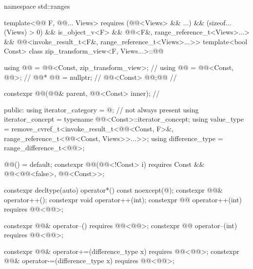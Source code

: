 %
\begin{codeblock}
namespace std::ranges {
  template<@@ F, @@... Views>
    requires (@@<Views> && ...) && (sizeof...(Views) > 0) && is_object_v<F> &&
              @@<F&, range_reference_t<Views>...> &&
              @@<invoke_result_t<F&, range_reference_t<Views>...>>
  template<bool Const>
  class zip_transform_view<F, Views...>::@@ {
    using @@ = @@<Const, zip_transform_view>;      // \expos
    using @@ = @@<Const, @@>;                 // \expos
    @@* @@ = nullptr;                                  // \expos
    @@<Const> @@;@\itcorr[-1]@                                    // \expos

    constexpr @@(@@& parent, @@<Const> inner);   // \expos

  public:
    using iterator_category = @\seebelownc@;                        // not always present
    using iterator_concept  = typename @@<Const>::iterator_concept;
    using value_type =
      remove_cvref_t<invoke_result_t<@@<Const, F>&,
                                     range_reference_t<@@<Const, Views>>...>>;
    using difference_type = range_difference_t<@@>;

    @@() = default;
    constexpr @@(@@<!Const> i)
      requires Const && @@<@@<false>, @@<Const>>;

    constexpr decltype(auto) operator*() const noexcept(@\seebelow@);
    constexpr @@& operator++();
    constexpr void operator++(int);
    constexpr @@ operator++(int) requires @@<@@>;

    constexpr @@& operator--() requires @@<@@>;
    constexpr @@ operator--(int) requires @@<@@>;

    constexpr @@& operator+=(difference_type x) requires @@<@@>;
    constexpr @@& operator-=(difference_type x) requires @@<@@>;

}}
\end{codeblock}
